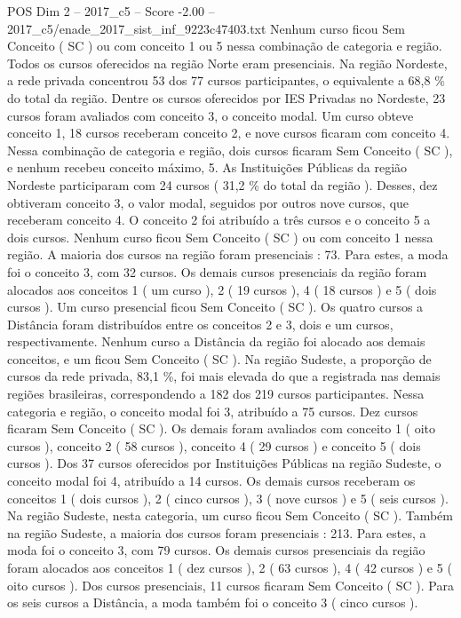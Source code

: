 \begin{textsample}{POS Dim 2 – 2017\_c5 – Score -2.00 – 2017\_c5/enade\_2017\_sist\_inf\_9223c47403.txt}
Nenhum curso ficou Sem Conceito ( SC ) ou com conceito 1 ou 5 nessa combinação de categoria e região.
Todos os cursos oferecidos na região Norte eram presenciais.
Na região Nordeste, a rede privada concentrou 53 dos 77 cursos participantes, o equivalente a 68,8 \% do total da região.
Dentre os cursos oferecidos por IES Privadas no Nordeste, 23 cursos foram avaliados com conceito 3, o conceito modal.
Um curso obteve conceito 1, 18 cursos receberam conceito 2, e nove cursos ficaram com conceito 4.
Nessa combinação de categoria e região, dois cursos ficaram Sem Conceito ( SC ), e nenhum recebeu conceito máximo, 5.
As Instituições Públicas da região Nordeste participaram com 24 cursos ( 31,2 \% do total da região ).
Desses, dez obtiveram conceito 3, o valor modal, seguidos por outros nove cursos, que receberam conceito 4.
O conceito 2 foi atribuído a três cursos e o conceito 5 a dois cursos.
Nenhum curso ficou Sem Conceito ( SC ) ou com conceito 1 nessa região.
A maioria dos cursos na região foram presenciais : 73.
Para estes, a moda foi o conceito 3, com 32 cursos.
Os demais cursos presenciais da região foram alocados aos conceitos 1 ( um curso ), 2 ( 19 cursos ), 4 ( 18 cursos ) e 5 ( dois cursos ).
Um curso presencial ficou Sem Conceito ( SC ).
Os quatro cursos a Distância foram distribuídos entre os conceitos 2 e 3, dois e um cursos, respectivamente.
Nenhum curso a Distância da região foi alocado aos demais conceitos, e um ficou Sem Conceito ( SC ).
Na região Sudeste, a proporção de cursos da rede privada, 83,1 \%, foi mais elevada do que a registrada nas demais regiões brasileiras, correspondendo a 182 dos 219 cursos participantes.
Nessa categoria e região, o conceito modal foi 3, atribuído a 75 cursos.
Dez cursos ficaram Sem Conceito ( SC ).
Os demais foram avaliados com conceito 1 ( oito cursos ), conceito 2 ( 58 cursos ), conceito 4 ( 29 cursos ) e conceito 5 ( dois cursos ).
Dos 37 cursos oferecidos por Instituições Públicas na região Sudeste, o conceito modal foi 4, atribuído a 14 cursos.
Os demais cursos receberam os conceitos 1 ( dois cursos ), 2 ( cinco cursos ), 3 ( nove cursos ) e 5 ( seis cursos ).
Na região Sudeste, nesta categoria, um curso ficou Sem Conceito ( SC ).
Também na região Sudeste, a maioria dos cursos foram presenciais : 213.
Para estes, a moda foi o conceito 3, com 79 cursos.
Os demais cursos presenciais da região foram alocados aos conceitos 1 ( dez cursos ), 2 ( 63 cursos ), 4 ( 42 cursos ) e 5 ( oito cursos ).
Dos cursos presenciais, 11 cursos ficaram Sem Conceito ( SC ).
Para os seis cursos a Distância, a moda também foi o conceito 3 ( cinco cursos ).

\end{textsample}
